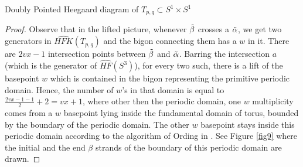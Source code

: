 \documentclass[11pt,reqno]{amsart}
\newtheorem {lemma}[theorem]{Lemma}
\theoremstyle{definition}
\newtheorem *{remark}{Remark}
\newcommand{\hfkhat}{\widehat{\mathit{HFK}}}
\begin{document}
\begin{subsection}{Doubly Pointed Heegaard diagram of $T_{p,q} \subset S^1 \times S^1$}
\begin{proof}
Observe that in the lifted picture, whenever $\Tilde{\beta}$ crosses a $\Tilde{\alpha}$, we get two generators in $\hfkhat(T_{p,q})$ and the bigon connecting them has a $w$ in it. There are $2vx - 1$ intersection points between $\Tilde{\beta}$ and $\Tilde{\alpha}$. Barring the intersection $a$ (which is the generator of $\widehat{HF}(S^3)$), for every two such, there is a lift of the basepoint $w$ which is contained in the bigon representing the primitive periodic domain. Hence, the number of $w$'s in that domain is equal to $ \frac{2vx-1-1}{2} + 2 = vx+1$, where other then the periodic domain, one $w$ multiplicity comes from a $w$ basepoint lying inside the fundamental domain of torus, bounded by the boundary of the periodic domain. The other $w$ basepoint stays inside this periodic domain according to the algorithm of Ording in \cite{ording06}. See Figure \ref{fig9} where the initial and the end $\beta$ strands of the boundary of this periodic domain are drawn. 
\end{proof}


 
 

  


\end{subsection}
\end{document}
